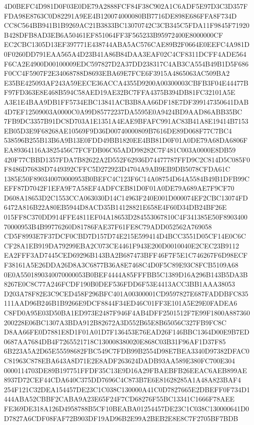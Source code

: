 \documentclass[UTF8,fontset=fandol,zihao=-4,a4paper]{ctexart}
\begin{document}
{{4D0BEFC4D981D0F03E0DE79A2888FCF84F38C902A1C6ADF5E97D3C3D357FFDA98E8763C0D82291A9EE4B120074000080BB7716DE898E686FFA8F734D
CC8C564BB941B1B9269AC21B3833BC13070742C3CB345C5FDA11F9845F71920B428DFB8AD3EB6A50461EF851064FF3F565233B95972400E8000000CF
EC2CBC1305D13EF397771E438744ABA5AC576CAE89B2F0664E0EEFC4A981D0F0260DD791EAA565A4D23B41A86B84DAA3EAF02C4CF8311DCFF4ADE564
F6CA2E4900D00100009EDC597827D2A37DD238317C4AB3CA554B49B1D5F686F0CC4F5907F2E34068788D8693EBA69E7FCE6F3915A4865063AC509BA2
E35BE425093AF243A59EECE36ACCA4355D9200A00300003CBFB3F04E44477BF97FD363E8E468B594C58AED19AE32BC7FFA4375B394DB81FC32101A5E
A3E1E4BAA9DB1FF5734EBC13841ACB3B8AA66DF18E7DF399147350641DAB4D7EF12509003A0000C0A99D85772237DA5595E0A9424BD9AAD86ABB35BC
7FB9DC3357B91DC8D703A1E1351A4EAE9BFAFC991AC83B41A8E19414B7153EB05D3E9F68268AE10569F9D36D00740000809B7616DE89D068F77C7BC4
538596B255B13B6A9B13E0FDD49BB1820EE4BB81D0F01A0DE79A68DA6806FEA89364116A3825456C7FCFDB06C65ADD98282C7F481C003A0000E8DB59
420F77CBBD1357FDA7B82622A2D552F62936D74477787FFD9C2C814D5C085F0F8486D76838D7449392CFFC5D272923D4704A9AB9EB9DB5078CFDA61C
1385E50F890340070000953B0BEFC4C123F6C14A08754D64A5584B49B1DFB99CEFF87D7042F1EFA9F7A58EF4ADFCEB81D0F01A0DE79A689AE7F9CF70
D608A18653D2C1553CCA063030D14C14963F240E001D000074EF2CBC13074FD6472A816B22A80EB5944D8ACD35B14128821E658E4F60D34DB24BF26E
015FF8C370DD914FFE4811EF04A18653D284553067810C4F341385E50F890340070000953B4B99776260D81786FAE37F61FE8C79ADD052562A769058
CD5F8993E7F37DCF0CBD7D157D74E215E599414D4BCC3551D05CF14E0C6CCF28A1EB919DA79299EBA2C073CE4461F943E200D0010040E2CEC23B9112
EA2FFF3AD7445CED69296B143BA2B687473BFF46F7F5E1C746267F6D98ECFF38161A5E26DDA26D8A3C6877B36A8E7468C4D0F5C89E93C8FCB5109A68
0E0A5501890340070000053B0BEF4444A85FFFBB5C1389D16A296B143B5DA3B8267E0C8C77A246FCDF190B0DEF536FDD6F53E4413ACC3BB1AAA38053
D203A78F82E3C9CED458F296BFC401A00300001CD9597827E687FADDBFC835111AAD96B246B1B9266E9DCF8844F34ED46C01FF3E101A5E29E0FADEA6
C8FD0A95E03D50BA1ED973E2487F946F4AB4DFF2501512F7E99F1800A887360200228E06BC1307A3BDA912B82672A3D552B65E8B65056C327FB9FC8C
D8AA66FE0D7881E8D1F01A01D7F136453E76EAD26F146BBC1364D00E9B7ED0687AA7684DB4F7265521718C130008380020E868C03B31F96AF1D37F85
6B223A5A2D65E55598682FBC549C7FDB99B2554D98E7BEA3340D97382DFAC0C81963C878EBA643A8D71E2E8ADF263624DADB93AA589E380FC700E304
0000114703DE89B197751FFDF35C13E9D16A29FBAEBFB26EEAC6AEB899AE8937D72CEF44CDA640C375DD7696C4C873B7E6E81628285A1A48A823BAF4
254F121C32DEA154457DE23C1C038C130000A41C0D7827665E2DBEFF0F734D1444ABA52CBBF2CABA9A23E65F24F7CD68276F55BC13341C1666F78AEE
FE369DE318A126D4958788B5CF10BEABA01254457DE23C1C038C130000641D0D7827A6CDF08FAF72B903DF19AD96B2E99A2BEB2E8E8C7F2705BF7BDB
}}
\end{document}
